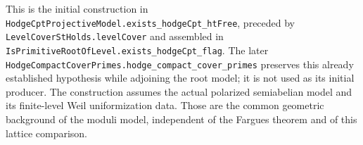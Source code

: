 This is the initial construction in
\texttt{HodgeCptProjectiveModel.exists\_hodgeCpt\_htFree},
preceded by
\texttt{LevelCoverStHolds.levelCover}
and assembled in
\texttt{IsPrimitiveRootOfLevel.exists\_hodgeCpt\_flag}.
The later
\texttt{HodgeCompactCoverPrimes.hodge\_compact\_cover\_primes}
preserves this already established hypothesis while
adjoining the root model; it is not used as its
initial producer.
The construction assumes the actual polarized
semiabelian model and its finite-level Weil
uniformization data. Those are the common geometric
background of the moduli model, independent of the
Fargues theorem and of this lattice comparison.

